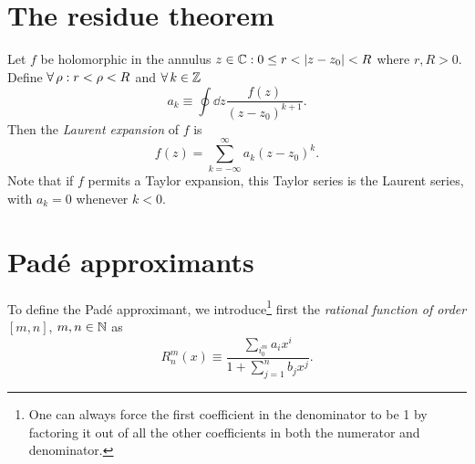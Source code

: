 \section{The residue theorem}

Let $f$ be holomorphic in the annulus ${z\in\C : 0\leq r<|z-z_0|<R}$
where $r,R>0$.
Define $\operatorname{\forall}\rho : r<\rho<R$ and $\operatorname{\forall} k\in\mathbb{Z}$
\begin{equation}
  a_k\equiv\oint\dd{z}\frac{f(z)}{(z-z_0)^{k+1}}.
\end{equation}
Then the {\it Laurent expansion} of $f$ is
\begin{equation}
  f(z)=\sum_{k=-\infty}^\infty a_k(z-z_0)^k.
\end{equation}
Note that if $f$ permits a Taylor expansion, this Taylor series is the Laurent
series, with $a_k=0$ whenever $k<0$.



\section{Pad\'e approximants}

To define the Pad\'e approximant, we introduce\footnote{One can always force
the first coefficient in the denominator to be 1 by factoring it out of all
the other coefficients in both the numerator and denominator.} first the {\it rational
function of order} $[m,n]$, $m,n\in\mathbb{N}$ as 
\begin{equation}
  R_n^m(x)\equiv\frac{\sum_i_0^m a_ix^i}{1+\sum_{j=1}^nb_jx^j}.
\end{equation}




